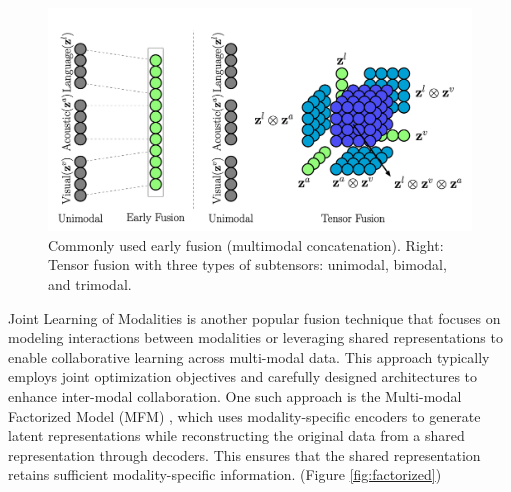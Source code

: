 \documentclass{article}
\begin{document}
\begin{figure}[h]
    \centering
    \includegraphics[width=1\linewidth]{figs/tensor fusion.png}
    \caption{Commonly used early fusion (multimodal concatenation). Right: Tensor fusion with three types of subtensors: unimodal, bimodal, and trimodal. \cite{zadeh-etal-2017-tensor}}
    \label{fig:tensor-fusion}
\end{figure}

Joint Learning of Modalities is another popular fusion technique that focuses on modeling interactions between modalities or leveraging shared representations to enable collaborative learning across multi-modal data. This approach typically employs joint optimization objectives and carefully designed architectures to enhance inter-modal collaboration. One such approach is the Multi-modal Factorized Model (MFM) \cite{FactorizedMult}, which uses modality-specific encoders to generate latent representations while reconstructing the original data from a shared representation through decoders. This ensures that the shared representation retains sufficient modality-specific information. (Figure \ref{fig:factorized})
\end{document}
